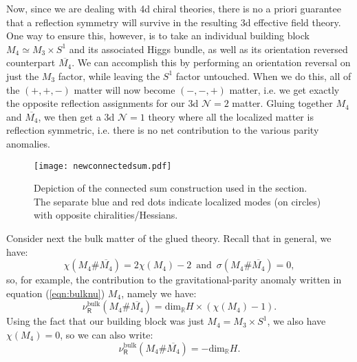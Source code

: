 \documentclass[12pt]{article}%
\numberwithin{equation}{section}
\renewcommand{\(}{\left(}
\renewcommand{\)}{\right)}
\renewcommand{\[}{\left[}
\renewcommand{\]}{\right]}
\begin{document}
Now, since we are dealing with 4d chiral theories, there is no a priori guarantee that
a reflection symmetry will survive in the resulting 3d effective field theory.
One way to ensure this, however, is to take an individual building block
$M_{4} \simeq M_{3} \times S^{1}$ and its associated Higgs bundle, as well as its
orientation reversed counterpart $\overline{M_{4}} $. We can accomplish this by performing an orientation reversal
on just the $M_{3}$ factor, while leaving the $S^1$ factor untouched. When we do this, all of the $(+,+,-)$ matter
will now become $(-,-,+)$ matter, i.e. we get exactly the opposite reflection assignments for our 3d $\mathcal{N} = 2$ matter.
Gluing together $M_{4}$ and $\overline{M_{4}}$, we then get a 3d $\mathcal{N} = 1$ theory where all the localized matter is reflection symmetric, i.e. there is no net contribution to the various parity anomalies.
\begin{figure}[t!]
\begin{center}
\texttt{[image: newconnectedsum.pdf]}
\caption{Depiction of the connected sum construction used in the section. The separate blue and red dots indicate localized modes (on circles) with opposite chiralities/Hessians.}
\label{fig:newconnsum}
\end{center}
\end{figure}
Consider next the bulk matter of the glued theory. Recall that in general, we have:
\begin{equation}
\chi(M_4 \# \overline{M_4}) = 2\chi(M_4) -2 \,\,\, \text{and} \,\,\, \sigma(M_4 \# \overline{M_4}) = 0,
\end{equation}
so, for example, the contribution to the gravitational-parity anomaly written in equation (\ref{eqn:bulknu})
$M_4$, namely we have:
\begin{equation}\label{eqn:bulknuagain}
\nu^{\mathrm{bulk}}_{\mathsf{R}}(M_4 \# \overline{M_4}) = \mathrm{dim}_{\mathbb{R}} H \times  (\chi(M_4) - 1).
\end{equation}
Using the fact that our building block was just $M_{4} = M_{3} \times S^1$, we also have $\chi(M_4) = 0$, so we can also write:
\begin{equation}\label{eqn:bulknuagain}
\nu^{\mathrm{bulk}}_{\mathsf{R}}(M_4 \# \overline{M_4}) = - \mathrm{dim}_{\mathbb{R}} H.
\end{equation}
\end{document}

